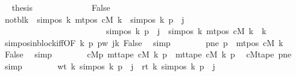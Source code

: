 \begin{isabellebody}
\ \isamarkupfalse%
\ {\isacharquery}{\kern0pt}thesis\ \isakeywordONE{{\isachardot}{\kern0pt}}\isamarkupfalse%
\isanewline
\ \ \ \ \isamarkupfalse%
\isanewline
\ \ \ \ \ \ \isamarkupfalse%
\ False\isanewline
\ \ \ \ \ \ \isamarkupfalse%
\ notblk{\isacharcolon}{\kern0pt}\ {\isachardoublequoteopen}{\isasymnot}\ {\isacharparenleft}{\kern0pt}sim{\isacharunderscore}{\kern0pt}pos\ {\isacharquery}{\kern0pt}k\ {\isacharparenleft}{\kern0pt}mt{\isacharunderscore}{\kern0pt}pos\ cM\ k{\isacharparenright}{\kern0pt}\ {\isasymle}\ sim{\isacharunderscore}{\kern0pt}pos\ {\isacharquery}{\kern0pt}k\ p\ {\isacharplus}{\kern0pt}\ j\isanewline
\ \ \ \ \ \ \ \ \ \ \ \ \ \ \ \ \ \ \ \ \ \ \ \ {\isasymand}\ sim{\isacharunderscore}{\kern0pt}pos\ {\isacharquery}{\kern0pt}k\ p\ {\isacharplus}{\kern0pt}\ j\ {\isacharless}{\kern0pt}\ sim{\isacharunderscore}{\kern0pt}pos\ {\isacharquery}{\kern0pt}k\ {\isacharparenleft}{\kern0pt}mt{\isacharunderscore}{\kern0pt}pos\ cM\ k{\isacharparenright}{\kern0pt}\ {\isacharplus}{\kern0pt}\ {\isacharquery}{\kern0pt}k{\isacharparenright}{\kern0pt}{\isachardoublequoteclose}\isanewline
\ \ \ \ \ \ \ \ \isamarkupfalse%
\ sim{\isacharunderscore}{\kern0pt}pos{\isacharunderscore}{\kern0pt}in{\isacharunderscore}{\kern0pt}block{\isacharunderscore}{\kern0pt}iff{\isacharbrackleft}{\kern0pt}OF\ k{}\ p{}\ pw{}\ jk{\isacharbrackright}{\kern0pt}\ False\ \isamarkupfalse%
\ simp\isanewline
\ \ \ \ \ \ \isamarkupfalse%
\ pne{\isacharcolon}{\kern0pt}\ {\isachardoublequoteopen}p\ {\isasymnoteq}\ mt{\isacharunderscore}{\kern0pt}pos\ cM\ k{\isachardoublequoteclose}\ \isamarkupfalse%
\ False\ \isamarkupfalse%
\ simp\isanewline
\ \ \ \ \ \ \isamarkupfalse%
\ cM{}p{\isacharcolon}{\kern0pt}\ {\isachardoublequoteopen}mt{\isacharunderscore}{\kern0pt}tape\ cM{\isacharunderscore}{\kern0pt}{}\ k\ p\ {\isacharequal}{\kern0pt}\ mt{\isacharunderscore}{\kern0pt}tape\ cM\ k\ p{\isachardoublequoteclose}\ \isamarkupfalse%
\ cM{}tape\ pne\ \isamarkupfalse%
\ simp\isanewline
\ \ \ \ \ \ \isamarkupfalse%
\ {\isachardoublequoteopen}wt\ k\ {\isacharparenleft}{\kern0pt}sim{\isacharunderscore}{\kern0pt}pos\ {\isacharquery}{\kern0pt}k\ p\ {\isacharplus}{\kern0pt}\ j{\isacharparenright}{\kern0pt}\ {\isacharequal}{\kern0pt}\ rt\ k\ {\isacharparenleft}{\kern0pt}sim{\isacharunderscore}{\kern0pt}pos\ {\isacharquery}{\kern0pt}k\ p\ {\isacharplus}{\kern0pt}\ j{\isacharparenright}{\kern0pt}{\isachardoublequoteclose}\isanewline

\end{isabellebody}
